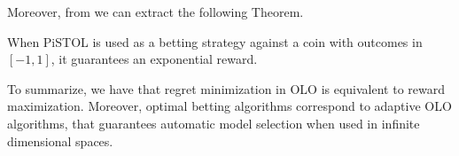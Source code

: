 Moreover, from \citep{} we can extract the following Theorem.
\begin{theorem}
When PiSTOL is used as a betting strategy against a coin with outcomes in $[-1,1]$, it guarantees an exponential reward.
\end{theorem}

To summarize, we have that regret minimization in OLO is equivalent to reward maximization. Moreover, optimal betting algorithms correspond to adaptive OLO algorithms, that guarantees automatic model selection when used in infinite dimensional spaces.